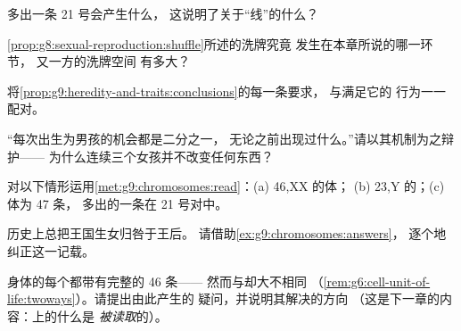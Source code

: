 \begin{exercise}[$\star$]\label{exo:g9:chromosomes:6}
多出一条 21 号会产生什么，
这说明了关于“线”的什么？
\end{exercise}

\begin{exercise}[$\star\star$]\label{exo:g9:chromosomes:7}
\cref{prop:g8:sexual-reproduction:shuffle}所述的洗牌究竟
发生在本章所说的哪一环节，
又一方的洗牌空间
有多大？
\end{exercise}

\begin{exercise}[$\star\star$]\label{exo:g9:chromosomes:8}
将\cref{prop:g9:heredity-and-traits:conclusions}的每一条要求，
与满足它的
行为一一配对。
\end{exercise}

\begin{exercise}[$\star\star$]\label{exo:g9:chromosomes:9}
“每次出生为男孩的机会都是二分之一，
无论之前出现过什么。”请以其机制为之辩护——
为什么连续三个女孩并不改变任何东西？
\end{exercise}

\begin{exercise}[$\star\star$]\label{exo:g9:chromosomes:10}
对以下情形运用\cref{met:g9:chromosomes:read}：(a) 46,XX 的体；
(b) 23,Y 的；(c) 体为 47 条，
多出的一条在 21 号对中。
\end{exercise}

\begin{exercise}[$\star\star$]\label{exo:g9:chromosomes:11}
历史上总把王国生女归咎于王后。
请借助\cref{ex:g9:chromosomes:answers}，
逐个地纠正这一记载。
\end{exercise}

\begin{exercise}[$\star\star\star$]\label{exo:g9:chromosomes:12}
身体的每个都带有完整的 46 条——
然而与却大不相同
（\cref{rem:g6:cell-unit-of-life:twoways}）。请提出由此产生的
疑问，并说明其解决的方向
（这是下一章的内容：上的什么是
\emph{被读取}的）。
\end{exercise}

